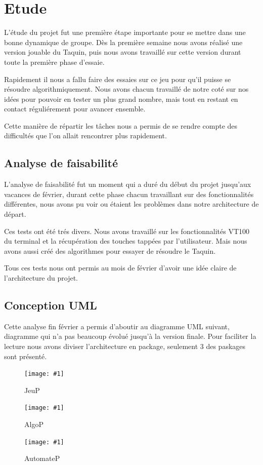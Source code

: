 ﻿\documentclass[a4paper,twoside,12pt]{report}
\newcommand{\monimage}[4]{
\par\noindent
\begin{figure}[H] %
\begin{center}
\texttt{[image: \#1]} %
\caption{#2} %
\label{#3} %
\end{center}
\end{figure} %
}
\newcommand{\ml}[0]{\par\noindent}
\begin{document}
\chapter{Etude}
\par
L'étude du projet fut une première étape importante pour se mettre dans une 
bonne dynamique de groupe. Dès la première semaine nous avons réalisé une 
version jouable du Taquin, puis nous avons travaillé sur cette version durant 
toute la première phase d'essaie.
\par\noindent
Rapidement il nous a fallu faire des essaies sur ce jeu pour qu'il puisse se 
résoudre algorithmiquement. Nous avons chacun travaillé de notre coté sur nos 
idées pour pouvoir en tester un plus grand nombre, mais tout en restant en 
contact réguliérement pour avancer ensemble.
\par\noindent
Cette manière de répartir les tâches nous a permis de se rendre compte des 
difficultés que l'on allait rencontrer plus rapidement.
%
\section{Analyse de faisabilité}
\par
L'analyse de faisabilité fut un moment qui a duré du début du projet jusqu'aux 
vacances de février, durant cette phase chacun travaillant sur des 
fonctionnalités différentes, nous avons pu voir ou étaient les problèmes dans 
notre architecture de départ.
\par\noindent
Ces tests ont été trés divers. Nous avons travaillé sur les fonctionnalités 
VT100 du terminal et la récupération des touches tappées par l'utilisateur. Mais 
nous avons aussi créé des algorithmes pour essayer de résoudre le Taquin.
\par\noindent
Tous ces tests nous ont permis au mois de février d'avoir une idée claire de 
l'architecture du projet.
\section{Conception UML}
\par
Cette analyse fin février a permis d'aboutir au diagramme UML suivant, diagramme 
qui n'a pas beaucoup évolué jusqu'à la version finale. Pour
faciliter la lecture nous avons diviser l'architecture en package, seulement 3 
des paskages sont présenté.
\ml
\monimage{../dev/jeuPackage.png}{JeuP}{Représentation UML du package jeu}{0.9}
\ml
\monimage{../dev/algoPackage.png}{AlgoP}{Représentation UML du package 
algo}{0.9}
\ml
\monimage{../dev/automatePackage.png}{AutomateP}{Représentation UML du package 
automate}{0.3}
\end{document}
